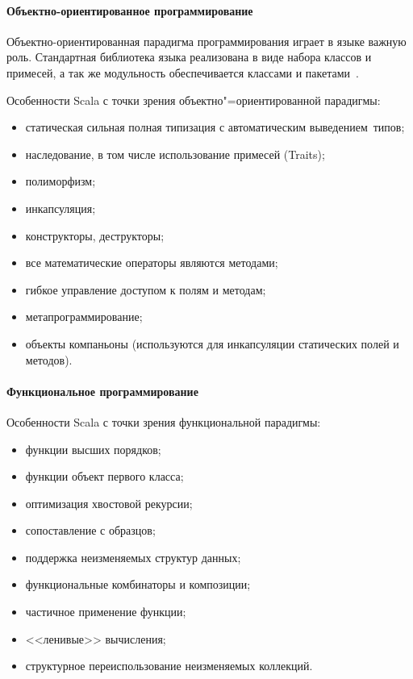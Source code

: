 \paragraph{Объектно-ориентированное программирование}
Объектно-ориентированная парадигма программирования играет в языке важную роль. Стандартная библиотека языка реализована в виде набора классов и примесей, а так же модульность обеспечивается классами и пакетами~\cite{horsman_scala}.

Особенности Scala с точки зрения объектно"=ориентированной \mbox{парадигмы:}
\begin{itemize}
  \item статическая сильная полная типизация с автоматическим \mbox{выведением типов;}
  \item наследование, в том числе использование примесей (Traits);
  \item полиморфизм;
  \item инкапсуляция;
  \item конструкторы, деструкторы;
  \item все математические операторы являются методами;
  \item гибкое управление доступом к полям и методам;
  \item метапрограммирование;
  \item объекты компаньоны (используются для инкапсуляции статических полей и методов).
\end{itemize}

\paragraph{Функциональное программирование}
Особенности Scala с точки зрения функциональной парадигмы:
\begin{itemize}
  \item функции высших порядков;
  \item функции объект первого класса;
  \item оптимизация хвостовой рекурсии;
  \item сопоставление с образцов;
  \item поддержка неизменяемых структур данных;
  \item функциональные комбинаторы и композиции;
  \item частичное применение функции;
  \item <<ленивые>> вычисления;
  \item структурное переиспользование неизменяемых коллекций.
\end{itemize}

